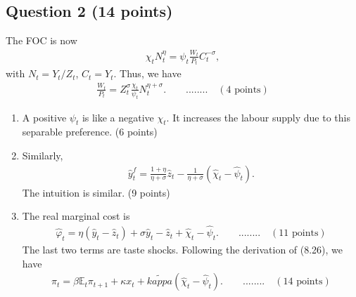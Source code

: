 \documentclass[12pt]{article}
\begin{document}
\subsection*{Question 2 (14 points)}
The FOC is now
\begin{align*}
    \chi_t N_t^{\eta} = \psi_t \frac{W_t}{P_t} C_t^{-\sigma},
\end{align*}
with $N_t = Y_t/Z_t$, $C_t = Y_t$. Thus, we have
\begin{align*}
    \frac{W_t}{P_t} = Z_t^{\sigma} \frac{\chi_t}{\psi_t} N_t^{\eta + \sigma}. \qquad ........ \quad(4 \text{ points})
\end{align*}
\begin{enumerate}
    \item A positive $\psi_t$ is like a negative $\chi_t$. It increases the labour supply due to this separable preference. (6 points)
    \item Similarly, 
    \begin{align*}
        \hat{y}_t^f = \frac{1+\eta}{\eta+\sigma} \hat{z}_t - \frac{1}{\eta+\sigma} (\hat{\chi}_t-\hat{\psi}_t).
    \end{align*}
    The intuition is similar. (9 points)
    \item The real marginal cost is
    \begin{align*}
        \hat{\varphi}_t = \eta(\hat{y}_t - \hat{z}_t) + \sigma \hat{y}_t - \hat{z}_t + \hat{\chi}_t - \hat{\psi}_t. \qquad ........ \quad(11 \text{ points})
    \end{align*}
    The last two terms are taste shocks. Following the derivation of (8.26), we have
    \begin{align*}
        \pi_t = \beta \mathbb{E}_t \pi_{t+1} + \kappa x_t + \tilde{kappa} (\hat{\chi}_t - \hat{\psi}_t). \qquad ........ \quad(14 \text{ points})
    \end{align*}
\end{enumerate}
\end{document}
